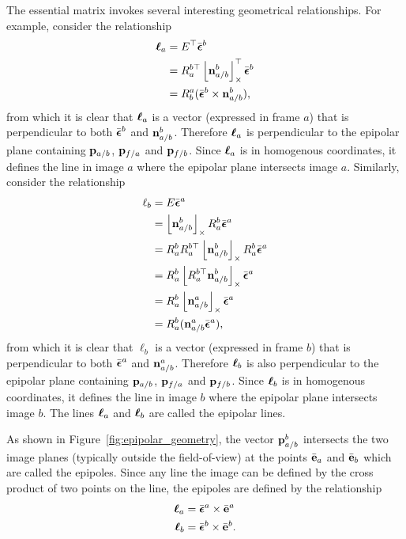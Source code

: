 The essential matrix invokes several interesting geometrical relationships.  For example, consider the relationship
\begin{align*}
\boldsymbol{\ell}_a &= E^\top \bar{\boldsymbol{\epsilon}}^b\\
	&= R_a^{b\top} \left\lfloor\mathbf{n}_{a/b}^b\right\rfloor_{\times}^\top \bar{\boldsymbol{\epsilon}}^b \\
	&= R_b^a (\bar{\boldsymbol{\epsilon}}^b \times \mathbf{n}_{a/b}^b),
\end{align*}
from which it is clear that $\boldsymbol{\ell}_a$ is a vector (expressed in frame $a$) that is perpendicular to both $\bar{\boldsymbol{\epsilon}}^b$ and $\mathbf{n}_{a/b}^b$.  Therefore $\boldsymbol{\ell}_a$ is perpendicular to the epipolar plane containing $\mathbf{p}_{a/b}$, $\mathbf{p}_{f/a}$ and $\mathbf{p}_{f/b}$.  Since $\boldsymbol{\ell}_a$ is in homogenous coordinates, it defines the line in image $a$ where the epipolar plane intersects image $a$.  
%
Similarly, consider the relationship
\begin{align*}
\ell_b &= E \bar{\boldsymbol{\epsilon}}^a \\
       &= \left\lfloor\mathbf{n}_{a/b}^b\right\rfloor_{\times}R_a^b \bar{\boldsymbol{\epsilon}}^a \\
       &= R_a^b R_a^{b\top} \left\lfloor\mathbf{n}_{a/b}^b\right\rfloor_{\times}R_a^b \bar{\boldsymbol{\epsilon}}^a \\
       &= R_a^b \left\lfloor R_a^{b\top}\mathbf{n}_{a/b}^b\right\rfloor_{\times} \bar{\boldsymbol{\epsilon}}^a\\
       &= R_a^b \left\lfloor\mathbf{n}_{a/b}^a\right\rfloor_{\times} \bar{\boldsymbol{\epsilon}}^a \\
       &= R_a^b (\mathbf{n}_{a/b}^a \bar{\boldsymbol{\epsilon}}^a),
\end{align*}
from which it is clear that $\ell_b$ is a vector (expressed in frame $b$) that is perpendicular to both $\bar{\boldsymbol{\epsilon}}^a$ and $\mathbf{n}_{a/b}^a$.  Therefore $\boldsymbol{\ell}_b$ is also perpendicular to the epipolar plane containing $\mathbf{p}_{a/b}$, $\mathbf{p}_{f/a}$ and $\mathbf{p}_{f/b}$.  Since $\boldsymbol{\ell}_b$ is in homogenous coordinates, it defines the line in image $b$ where the epipolar plane intersects image $b$.  
%
The lines $\boldsymbol{\ell}_a$ and $\boldsymbol{\ell}_b$ are called the epipolar lines.  

As shown in Figure~\ref{fig:epipolar_geometry}, the vector $\mathbf{p}_{a/b}^b$ intersects the two image planes (typically outside the field-of-view) at the points $\bar{\mathbf{e}}_a$ and $\bar{\mathbf{e}}_b$ which are called the epipoles.  Since any line the image can be defined by the cross product of two points on the line, the epipoles are defined by the relationship
\begin{align*}
\boldsymbol{\ell}_a &= \bar{\boldsymbol{\epsilon}}^a \times \bar{\mathbf{e}}^a \\
\boldsymbol{\ell}_b &= \bar{\boldsymbol{\epsilon}}^b \times \bar{\mathbf{e}}^b.
\end{align*}

